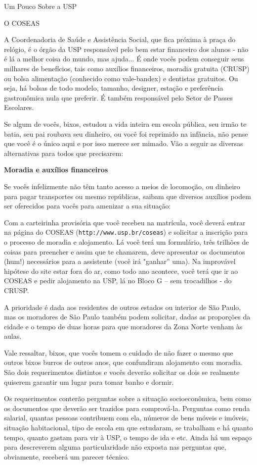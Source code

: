 \begin{secao}{Um Pouco Sobre a USP}
\begin{subsecao}{O COSEAS}

A Coordenadoria de Saúde e Assistência Social, que fica próxima à praça do relógio,
é o órgão da USP responsável pelo bem estar financeiro dos alunos - não é lá a
melhor coisa do mundo, mas ajuda... É onde vocês podem conseguir seus milhares de
benefícios, tais como auxílios financeiros, moradia gratuita (CRUSP) ou bolsa
alimentação (conhecido como vale-bandex) e dentistas gratuitos. Ou seja, há
bolsas de todo modelo, tamanho, designer, estação e preferência gastronômica
nula que preferir. É também responsável pelo Setor de Passes Escolares.

Se algum de vocês, bixos, estudou a vida inteira em escola pública, seu irmão te batia,
seu pai roubava seu dinheiro, ou você foi reprimido na infância, não pense que
você é o único aqui e por isso merece ser mimado. Vão a seguir as diversas
alternativas para todos que precisarem:

{\bf Moradia e auxílios financeiros}

Se vocês infelizmente não têm tanto acesso a meios de locomoção, ou dinheiro para
pagar transportes ou mesmo repúblicas, saibam que diversos auxílios podem ser
oferecidos para vocês para amenizar a sua situação:

Com a carteirinha provisória que você recebeu na matrícula, você deverá entrar
na página do COSEAS ({\tt http://www.usp.br/coseas}) e solicitar a inscrição
para o processo de moradia e alojamento. Lá você terá um formulário, três
trilhões de coisas para preencher e assim que te chamarem, deve apresentar os
documentos (hum!) necessários para a assistente (você irá "ganhar” uma). Na
improvável hipótese do site estar fora do ar, como todo ano acontece, você terá
que ir ao COSEAS e pedir alojamento na USP, lá no Bloco G – sem trocadilhos - do
CRUSP.

A prioridade é dada aos residentes de outros estados ou interior de São Paulo,
mas os moradores de São Paulo também podem solicitar, dadas as proporções da
cidade e o tempo de duas horas para que moradores da Zona Norte venham às aulas.

Vale ressaltar, bixos, que vocês tomem o cuidado de não fazer o mesmo que outros
bixos burros de outros anos, que confundiram alojamento com moradia. São dois
requerimentos distintos e vocês deverão solicitar os dois se realmente quiserem
garantir um lugar para tomar banho e dormir.

Os requerimentos conterão perguntas sobre a situação socioeconômica, bem como os
documentos que deverão ser trazidos para comprová-la. Perguntas como renda
salarial, quantas pessoas contribuem com ela, números de bens móveis e imóveis,
situação habitacional, tipo de escola em que estudaram, se trabalham e há quanto
tempo, quanto gastam para vir à USP, o tempo de ida e etc. Ainda há um espaço
para descreverem alguma particularidade não exposta nas perguntas que, obviamente,
receberá um parecer técnico.


\end{subsecao}
\end{secao}
